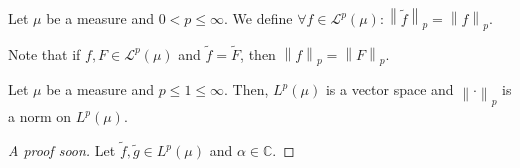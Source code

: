\begin{frame}
	\begin{definition}
		Let $\mu$ be a measure and $0<p\leq\infty$.
		We define
		\begin{math}
			\forall f\in\mathcal{L}^{p}\left(\mu\right):
			{\left\|\widetilde{f}\right\|}_{p}=
				{\left\|f\right\|}_{p}
		\end{math}.

		Note that if $f,F\in\mathcal{L}^{p}\left(\mu\right)$
		and $\widetilde{f}=\widetilde{F}$, then
		\begin{math}
			{\left\|f\right\|}_{p}=
				{\left\|F\right\|}_{p}
		\end{math}.
	\end{definition}

	\begin{theorem}
		Let $\mu$ be a measure and $p\leq 1\leq\infty$.
		Then, $L^{p}\left(\mu\right)$ is a \alert{vector space} and
		${\left\|\cdot\right\|}_{p}$ is a norm on
		$L^{p}\left(\mu\right)$.
	\end{theorem}

	\begin{proof}[\alert{A proof soon}]
		Let
		\begin{math}
			\widetilde{f},\widetilde{g}\in
			L^{p}\left(\mu\right)
		\end{math}
		and $\alpha\in\mathds{C}$.

	\end{proof}
\end{frame}

